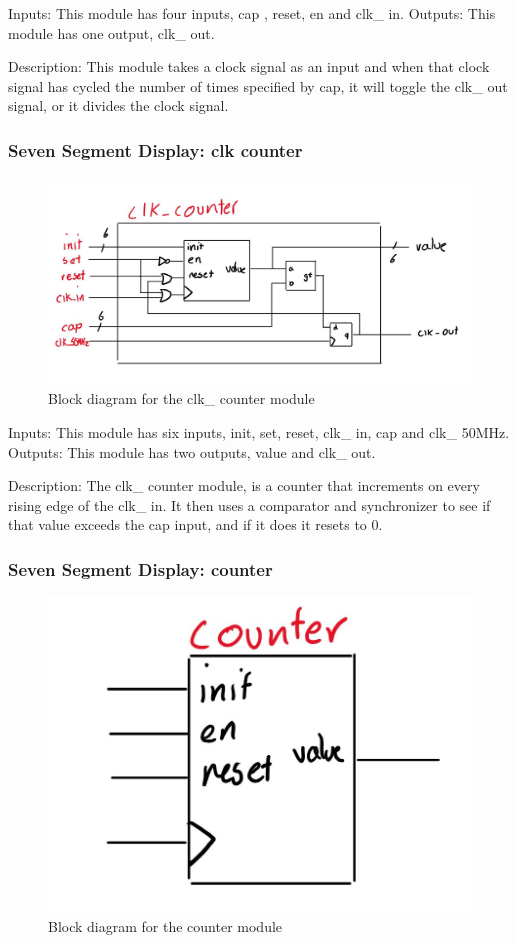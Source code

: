 \documentclass[a4paper]{article}
\begin{document}
Inputs: This module has four inputs, cap , reset, en and clk\_ in.
Outputs: This module has one output, clk\_ out.

Description: This module takes a clock signal as an input and when that clock signal has cycled the number of times specified by cap, it will toggle the clk\_ out signal, or it divides the clock signal.

\subsubsection{Seven Segment Display: clk counter}
\begin{figure}[H]
    \includegraphics[width=0.8 \linewidth]{images/clkcounter.JPG}
    \caption{Block diagram for the clk\_ counter module}
    \label{clkcounter}
\end{figure}


Inputs: This module has six inputs, init, set, reset, clk\_ in, cap and clk\_ 50MHz.
Outputs: This module has two outputs, value and clk\_ out.

Description: The clk\_ counter module, is a counter that increments on every rising edge of the clk\_ in. It then uses a comparator and synchronizer to see if that value exceeds the cap input, and if it does it resets to 0.

\subsubsection{Seven Segment Display: counter}
\begin{figure}[H]
    \includegraphics[width=0.8 \linewidth]{images/counter.JPG}
    \caption{Block diagram for the counter module}
    \label{counter}
\end{figure}
\end{document}
